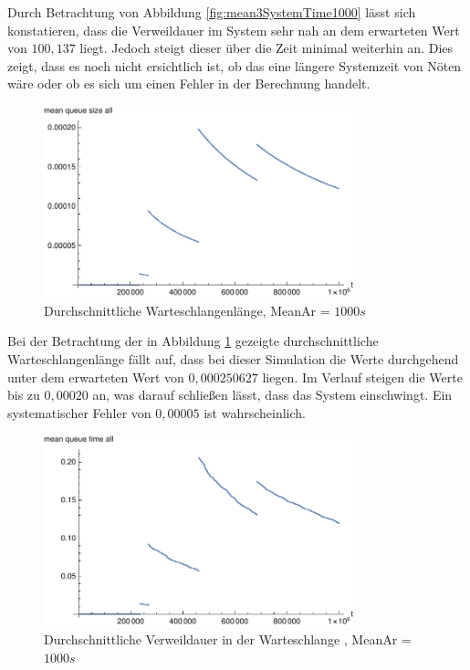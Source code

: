 Durch Betrachtung von Abbildung \ref{fig:mean3SystemTime1000} lässt sich konstatieren, dass die Verweildauer im System sehr nah an dem erwarteten Wert von $100,137$ liegt. Jedoch steigt dieser über die Zeit minimal weiterhin an. Dies zeigt, dass es noch nicht ersichtlich ist, ob das eine längere Systemzeit von Nöten wäre oder ob es sich um einen Fehler in der Berechnung handelt.

\begin{figure}[htpb]
	\centering
	\includegraphics[width=0.8\textwidth]{abbildungen/2_Phone_VIP/Arrival_1000_Serve_100_dur_1000000_Skip_0/MeanQueueSizeAll.pdf}
	\caption{Durchschnittliche Warteschlangenlänge, MeanAr = $1000s$}
	\label{fig:mean3QueueSize1000}
\end{figure}

Bei der Betrachtung der in Abbildung \ref{fig:mean3QueueSize1000} gezeigte durchschnittliche Warteschlangenlänge fällt auf, dass bei dieser Simulation die Werte durchgehend unter dem erwarteten Wert von $0,000250627$ liegen. Im Verlauf steigen die Werte bis zu $0,00020$ an, was darauf schließen lässt, dass das System einschwingt. Ein systematischer Fehler von $0,00005$ ist wahrscheinlich.

\begin{figure}[htpb]
	\centering
	\includegraphics[width=0.8\textwidth]{abbildungen/2_Phone_VIP/Arrival_1000_Serve_100_dur_1000000_Skip_0/MeanQueueTimeAll.pdf}
	\caption{Durchschnittliche Verweildauer in der Warteschlange , MeanAr = $1000s$}
	\label{fig:mean3QueueTime1000}
\end{figure} 

